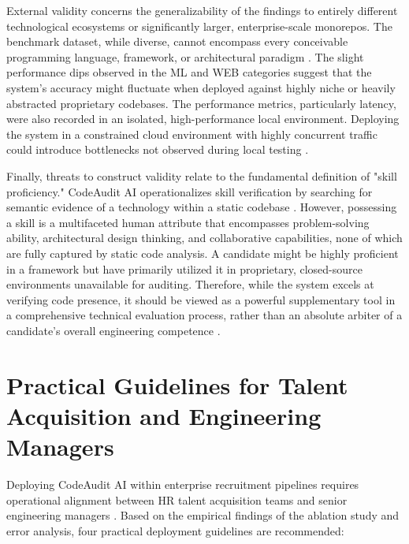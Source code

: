 External validity concerns the generalizability of the findings to entirely different technological ecosystems or significantly larger, enterprise-scale monorepos. The benchmark dataset, while diverse, cannot encompass every conceivable programming language, framework, or architectural paradigm \cite{ref1, ref58}. The slight performance dips observed in the ML and WEB categories suggest that the system's accuracy might fluctuate when deployed against highly niche or heavily abstracted proprietary codebases. The performance metrics, particularly latency, were also recorded in an isolated, high-performance local environment. Deploying the system in a constrained cloud environment with highly concurrent traffic could introduce bottlenecks not observed during local testing \cite{ref21, ref37}.

Finally, threats to construct validity relate to the fundamental definition of "skill proficiency." CodeAudit AI operationalizes skill verification by searching for semantic evidence of a technology within a static codebase \cite{ref14, ref71}. However, possessing a skill is a multifaceted human attribute that encompasses problem-solving ability, architectural design thinking, and collaborative capabilities, none of which are fully captured by static code analysis. A candidate might be highly proficient in a framework but have primarily utilized it in proprietary, closed-source environments unavailable for auditing. Therefore, while the system excels at verifying code presence, it should be viewed as a powerful supplementary tool in a comprehensive technical evaluation process, rather than an absolute arbiter of a candidate's overall engineering competence \cite{ref73, ref43}.


\section{Practical Guidelines for Talent Acquisition and Engineering Managers}

Deploying CodeAudit AI within enterprise recruitment pipelines requires operational alignment between HR talent acquisition teams and senior engineering managers \cite{ref1, ref4, ref23}. Based on the empirical findings of the ablation study and error analysis, four practical deployment guidelines are recommended:

